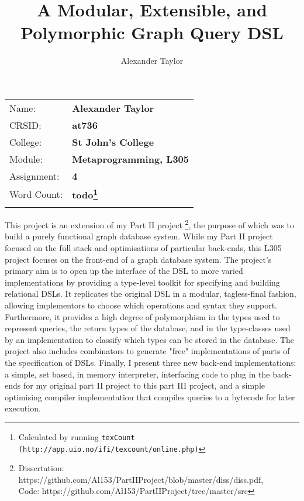 \documentclass{report}
\newcommand \2[0]{\textbf{2}}
\newcommand \3[0]{\textbf{3}}
\newcommand{\todo}[1]{\textbf{#1}}
\begin{document}
\title{A Modular, Extensible, and Polymorphic Graph Query DSL}
\author{Alexander Taylor}

\maketitle
{\large
\begin{tabular}{p{5cm}p{8cm}}
Name:       & \bf Alexander Taylor      \\
CRSID:      & \bf at736 \\
College:    & \bf St John's College  \\
Module:     & \bf Metaprogramming, L305 \\
Assignment: & \bf 4 \\
Word Count: & \bf \todo{todo}\footnote{Calculated by running \texttt{texCount (http://app.uio.no/ifi/texcount/online.php)}}   \\
                   \\ 
\end{tabular}
}



\abstract
This project is an extension of my Part II project \footnote{Dissertation: https://github.com/Al153/PartIIProject/blob/master/diss/diss.pdf,\\ Code: https://github.com/Al153/PartIIProject/tree/master/src}, the purpose of which was to build a purely functional graph database system. While my Part II project focused on the full stack and optimisations of particular back-ends, this L305 project focuses on the front-end of a graph database system. The project's primary aim is to open up the interface of the DSL to more varied implementations by providing a type-level toolkit for specifying and building relational DSLs. It replicates the original DSL in a modular, tagless-final fashion, allowing implementors to choose which operations and syntax they support. Furthermore, it provides a high degree of polymorphism in the types used to represent queries, the return types of the database, and in the type-classes used by an implementation to classify which types can be stored in the database. The project also includes combinators to generate "free" implementations of parts of the specification of DSLs. Finally, I present three new back-end implementations: a simple, set based, in memory interpreter, interfacing code to plug in the back-ends for my original part II project to this part III project, and a simple optimising compiler implementation that compiles queries to a bytecode for later execution.
\end{document}
